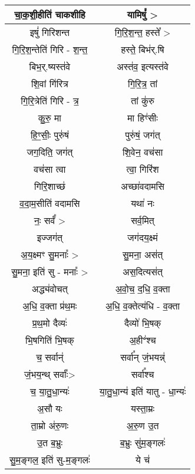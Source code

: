 {\begin{longtable}{|c|c|}
\hline
चा॒क॒शी॒हीति॑ चाकशीहि        & यामिषुं᳚ >\\
\hline
इषुं॑ गिरिशन्त               & गि॒रि॒श॒न्त॒ हस्ते᳚ >\\
\hline
गि॒रि॒श॒न्तेति॑ गिरि - श॒न्त॒     & हस्ते॒ बिभ॑र्.षि\\
\hline
बिभ॒र्.ष्यस्त॑वे               & अस्त॑व॒ इत्यस्त॑वे\\
\hline
शि॒वां गि॑रित्र              & गि॒रि॒त्र॒ तां\\
\hline
गि॒रि॒त्रेति॑ गिरि - त्र॒       & तां कु॑रु\\
\hline
कु॒रु॒ मा                    & मा हिꣳ॑सीः\\
\hline
हि॒ꣳ॒सीः॒ पुरु॑षं               & पुरु॑षं॒ जग॑त्\\
\hline
जग॒दिति॒ जग॑त्               & शि॒वेन॒ वच॑सा\\
\hline
वच॑सा त्वा                 & त्वा॒ गिरि॑श\\
\hline
गिरि॒शाच्छ॑                 & अच्छा॑वदामसि\\
\hline
व॒दा॒म॒सीति॑ वदामसि          & यथा॑ नः\\
\hline
नः॒ सर्वं᳚ >                 & सर्व॒मित्\\
\hline
इज्जग॑त्                    & जग॑दय॒क्ष्मं\\
\hline
अ॒य॒क्ष्मꣳ सु॒मनाः᳚ >           & सु॒मना॒ अस॑त्\\
\hline
सु॒मना॒ इति॑ सु - मनाः᳚ >      & अस॒दित्यस॑त्\\
\hline
अद्ध्य॑वोचत्                 & अ॒वो॒च॒ द॒धि॒ व॒क्ता\\
\hline
अ॒धि॒ व॒क्ता प्र॑थ॒मः            & अ॒धि॒ व॒क्तेत्य॑धि - व॒क्ता\\
\hline
प्र॒थ॒मो दैव्यः॑               & दैव्यो॑ भि॒षक्\\
\hline
भि॒षगिति॑ भि॒षक्             & अ॒हीꣲ॑श्च\\
\hline
च॒ सर्वान्॑                  & सर्वा᳚न् जं॒भयन्न्॑\\
\hline
जं॒भय॒न्थ् सर्वाः᳚>             & सर्वा᳚श्च\\
\hline
च॒ या॒तु॒धा॒न्यः॑               & या॒तु॒धा॒न्य॑ इति॑ यातु - धा॒न्यः॑\\
\hline
अ॒सौ यः                   & यस्ता॒म्रः\\
\hline
ता॒म्रो अ॑रु॒णः               & अ॒रु॒ण उ॒त\\
\hline
उ॒त ब॒भ्रुः                  & ब॒भ्रुः सु॑म॒ङ्गलः॑\\
\hline
सु॒म॒ङ्गल॒ इति॑ सु-म॒ङ्गलः॑        & ये च॑\\
\hline

\end{longtable}}
